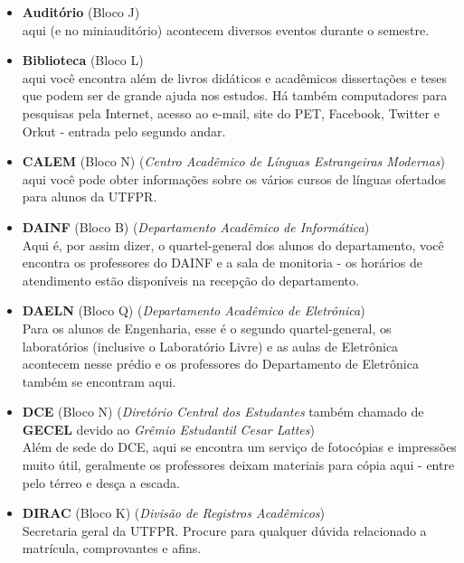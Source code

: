 \documentclass[a4paper,12pt,openany]{article}
\begin{document}
\begin{itemize}

\item \textbf{Auditório} (Bloco J)\\ aqui (e no miniauditório) acontecem diversos eventos durante o semestre.

\item \textbf{Biblioteca} (Bloco L) \\aqui você encontra além de livros didáticos e acadêmicos dissertações e teses que podem ser de grande ajuda nos estudos. Há também computadores para pesquisas pela Internet, acesso ao e-mail, site do PET, Facebook, Twitter e Orkut - entrada pelo segundo andar.

\item \textbf{CALEM} (Bloco N) (\textit{Centro Acadêmico de Línguas Estrangeiras Modernas}) \\aqui você pode obter informações sobre os vários cursos de línguas ofertados para alunos da UTFPR.

\item \textbf{DAINF} (Bloco B) (\textit{Departamento Acadêmico de Informática}) \\Aqui é, por assim dizer, o quartel-general dos alunos do departamento, você encontra os professores do DAINF e a sala de monitoria - os horários de atendimento estão disponíveis na recepção do departamento.

\item \textbf{DAELN} (Bloco Q) (\textit{Departamento Acadêmico de Eletrônica})\\ Para os alunos de Engenharia, esse é o segundo quartel-general, os laboratórios (inclusive o Laboratório Livre) e as aulas de Eletrônica acontecem nesse prédio e os professores do Departamento de Eletrônica também se encontram aqui.

\item \textbf{DCE} (Bloco N) (\textit{Diretório Central dos Estudantes} também chamado de \textbf{GECEL} devido ao \textit{Grêmio Estudantil Cesar Lattes})\\ Além de sede do DCE, aqui se encontra um serviço de fotocópias e impressões muito útil, geralmente os professores deixam materiais para cópia aqui - entre pelo térreo e desça a escada.

\item \textbf{DIRAC} (Bloco K) (\textit{Divisão de Registros Acadêmicos})\\ Secretaria geral da UTFPR. Procure para qualquer dúvida relacionado a matrícula, comprovantes e afins.


\end{itemize}
\end{document}
